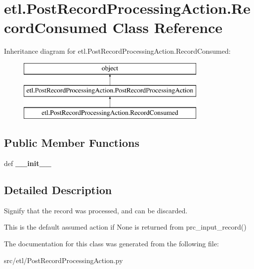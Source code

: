 \hypertarget{classetl_1_1PostRecordProcessingAction_1_1RecordConsumed}{\section{etl.\-Post\-Record\-Processing\-Action.\-Record\-Consumed Class Reference}
\label{classetl_1_1PostRecordProcessingAction_1_1RecordConsumed}
}
Inheritance diagram for etl.\-Post\-Record\-Processing\-Action.\-Record\-Consumed\-:\begin{figure}[H]
\begin{center}
\leavevmode
\includegraphics[height=3.000000cm]{classetl_1_1PostRecordProcessingAction_1_1RecordConsumed}
\end{center}
\end{figure}
\subsection*{Public Member Functions}
\begin{DoxyCompactItemize}
\item 
\hypertarget{classetl_1_1PostRecordProcessingAction_1_1RecordConsumed_abcb6479d91dff3ce5f739714abd7e12e}{def {\bfseries \-\_\-\-\_\-init\-\_\-\-\_\-}}\label{classetl_1_1PostRecordProcessingAction_1_1RecordConsumed_abcb6479d91dff3ce5f739714abd7e12e}

\end{DoxyCompactItemize}


\subsection{Detailed Description}
\begin{DoxyVerb}Signify that the record was processed, and can be discarded.

This is the default assumed action if None is returned from
prc_input_record()
\end{DoxyVerb}
 

The documentation for this class was generated from the following file\-:\begin{DoxyCompactItemize}
\item 
src/etl/Post\-Record\-Processing\-Action.\-py\end{DoxyCompactItemize}
